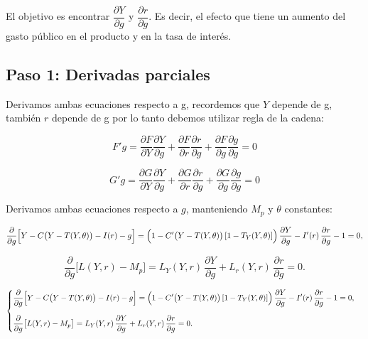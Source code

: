 \documentclass{article}
\begin{document}
El objetivo es encontrar $\dfrac{\partial Y}{\partial g}$ y $\dfrac{\partial r}{\partial g}$. Es decir, el efecto que tiene un aumento del gasto público en el producto y en la tasa de interés.



\subsection*{Paso 1: Derivadas parciales}

Derivamos ambas ecuaciones respecto a g, recordemos que $Y$ depende de g, también $r$ depende de g por lo tanto debemos utilizar regla de la cadena:

\begin{equation*}
F'g= \dfrac{\partial F}{\partial Y} \dfrac{\partial Y}{\partial g} +\dfrac{\partial F}{\partial r} \dfrac{\partial r}{\partial g} + \dfrac{\partial F}{\partial g} \dfrac{\partial g}{\partial g} =0
\end{equation*}


\begin{equation*}
G'g= \dfrac{\partial G}{\partial Y} \dfrac{\partial Y}{\partial g} +\dfrac{\partial G}{\partial r} \dfrac{\partial r}{\partial g} + \dfrac{\partial G}{\partial g} \dfrac{\partial g}{\partial g} =0
\end{equation*}


Derivamos ambas ecuaciones respecto a \(g\), manteniendo \(M_p\) y \(\theta\) constantes:

\[
\frac{\partial}{\partial g}\Bigl[Y - C\bigl(Y - T(Y,\theta)\bigr) - I(r) - g\Bigr]
= \Bigl(1 - C'\bigl(Y - T(Y,\theta)\bigr)\,[1 - T_Y(Y,\theta)]\Bigr)\,\frac{\partial Y}{\partial g}
- I'(r)\,\frac{\partial r}{\partial g}
- 1
= 0,
\]

\[
\frac{\partial}{\partial g}\bigl[L(Y,r) - M_p\bigr]
= L_Y(Y,r)\,\frac{\partial Y}{\partial g}
+ L_r(Y,r)\,\frac{\partial r}{\partial g}
= 0.
\]


\[
\begin{cases}
\displaystyle
\frac{\partial}{\partial g}\Bigl[Y - C\bigl(Y - T(Y,\theta)\bigr) - I(r) - g\Bigr]
= \Bigl(1 - C'\bigl(Y - T(Y,\theta)\bigr)\,[1 - T_Y(Y,\theta)]\Bigr)\,\dfrac{\partial Y}{\partial g}
- I'(r)\,\dfrac{\partial r}{\partial g}
- 1
= 0,\\[1.5em]
\displaystyle
\frac{\partial}{\partial g}\bigl[L(Y,r) - M_p\bigr]
= L_Y(Y,r)\,\dfrac{\partial Y}{\partial g}
+ L_r(Y,r)\,\dfrac{\partial r}{\partial g}
= 0.
\end{cases}
\]
\end{document}
